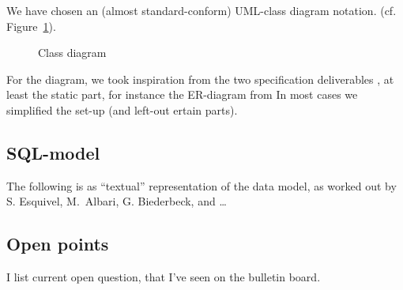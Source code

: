 We have chosen an (almost standard-conform) UML-class diagram notation.  (cf.
Figure~\ref{fig:classdiagram}).


\begin{figure}[htbp]
  \centering
  \caption{Class diagram}
  \label{fig:classdiagram}
\end{figure}

For the diagram, we took inspiration from the two specification deliverables
\cite{coma:spec1} \cite{coma:spec2}, at least the static part, for instance
the ER-diagram from \cite{coma:spec1} In most cases we simplified the set-up
(and left-out ertain parts).








\subsection*{SQL-model}
\label{sec:datamodel.sql}
%

The following is as ``textual'' representation of the data model, as worked
out by S. Esquivel, M.\ Albari, G. Biederbeck, and \ldots





\newpage






\subsection*{Open points}

I list current open question, that I've seen on the bulletin board.

